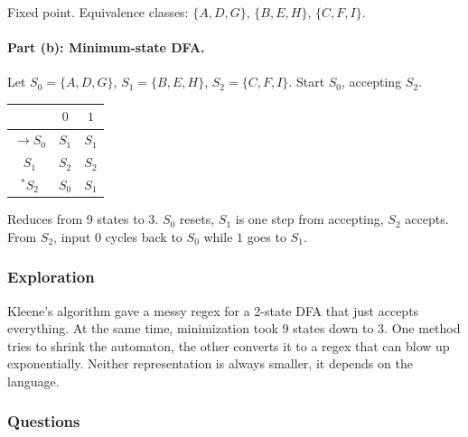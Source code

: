 \documentclass{article}
\theoremstyle{theorem}
\theoremstyle{definition}
\theoremstyle{remark}
\begin{document}
Fixed point. Equivalence classes: $\{A, D, G\}$, $\{B, E, H\}$, $\{C, F, I\}$.

\paragraph{Part (b): Minimum-state DFA.}
Let $S_0 = \{A, D, G\}$, $S_1 = \{B, E, H\}$, $S_2 = \{C, F, I\}$. Start $S_0$, accepting $S_2$.

\begin{center}
\begin{tabular}{c|cc}
 & $0$ & $1$ \\ \hline
$\to S_0$ & $S_1$ & $S_1$ \\
$S_1$ & $S_2$ & $S_2$ \\
${}^*S_2$ & $S_0$ & $S_1$ \\
\end{tabular}
\end{center}

\begin{center}
\end{center}

Reduces from 9 states to 3. $S_0$ resets, $S_1$ is one step from accepting, $S_2$ accepts. From $S_2$, input $0$ cycles back to $S_0$ while $1$ goes to $S_1$.

\subsubsection{Exploration}

Kleene's algorithm gave a messy regex for a 2-state DFA that just accepts everything. At the same time, minimization took 9 states down to 3. One method tries to shrink the automaton, the other converts it to a regex that can blow up exponentially. Neither representation is always smaller, it depends on the language.

\subsubsection{Questions}
\end{document}
